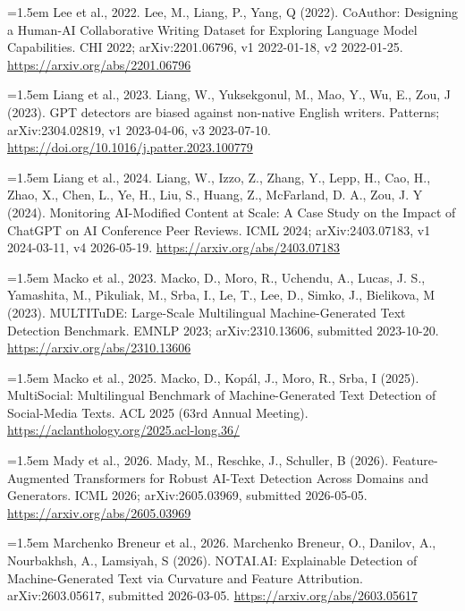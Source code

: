 \documentclass[11pt,a4paper]{article}
\renewcommand{\_}{\textunderscore\allowbreak}
\begin{document}
\noindent\hangindent=1.5em Lee et al., 2022. Lee, M., Liang, P., Yang, Q (2022). CoAuthor: Designing a Human-AI Collaborative Writing Dataset for Exploring Language Model Capabilities. CHI 2022; arXiv:2201.06796, v1 2022-01-18, v2 2022-01-25. \url{https://arxiv.org/abs/2201.06796}\par\smallskip

\noindent\hangindent=1.5em Liang et al., 2023. Liang, W., Yuksekgonul, M., Mao, Y., Wu, E., Zou, J (2023). GPT detectors are biased against non-native English writers. Patterns; arXiv:2304.02819, v1 2023-04-06, v3 2023-07-10. \url{https://doi.org/10.1016/j.patter.2023.100779}\par\smallskip

\noindent\hangindent=1.5em Liang et al., 2024. Liang, W., Izzo, Z., Zhang, Y., Lepp, H., Cao, H., Zhao, X., Chen, L., Ye, H., Liu, S., Huang, Z., McFarland, D. A., Zou, J. Y (2024). Monitoring AI-Modified Content at Scale: A Case Study on the Impact of ChatGPT on AI Conference Peer Reviews. ICML 2024; arXiv:2403.07183, v1 2024-03-11, v4 2026-05-19. \url{https://arxiv.org/abs/2403.07183}\par\smallskip

\noindent\hangindent=1.5em Macko et al., 2023. Macko, D., Moro, R., Uchendu, A., Lucas, J. S., Yamashita, M., Pikuliak, M., Srba, I., Le, T., Lee, D., Simko, J., Bielikova, M (2023). MULTITuDE: Large-Scale Multilingual Machine-Generated Text Detection Benchmark. EMNLP 2023; arXiv:2310.13606, submitted 2023-10-20. \url{https://arxiv.org/abs/2310.13606}\par\smallskip

\noindent\hangindent=1.5em Macko et al., 2025. Macko, D., Kop\'al, J., Moro, R., Srba, I (2025). MultiSocial: Multilingual Benchmark of Machine-Generated Text Detection of Social-Media Texts. ACL 2025 (63rd Annual Meeting). \url{https://aclanthology.org/2025.acl-long.36/}\par\smallskip

\noindent\hangindent=1.5em Mady et al., 2026. Mady, M., Reschke, J., Schuller, B (2026). Feature-Augmented Transformers for Robust AI-Text Detection Across Domains and Generators. ICML 2026; arXiv:2605.03969, submitted 2026-05-05. \url{https://arxiv.org/abs/2605.03969}\par\smallskip

\noindent\hangindent=1.5em Marchenko Breneur et al., 2026. Marchenko Breneur, O., Danilov, A., Nourbakhsh, A., Lamsiyah, S (2026). NOTAI.AI: Explainable Detection of Machine-Generated Text via Curvature and Feature Attribution. arXiv:2603.05617, submitted 2026-03-05. \url{https://arxiv.org/abs/2603.05617}\par\smallskip
\end{document}
